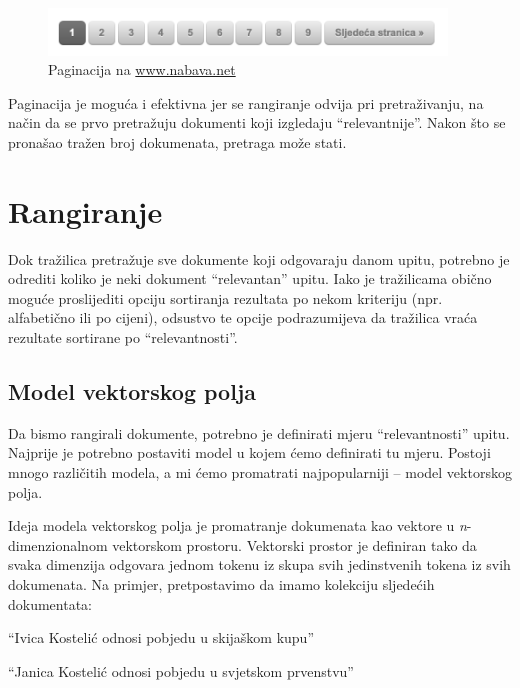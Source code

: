 \documentclass[a4paper,twoside,12pt]{scrreprt}
\begin{document}
\begin{figure}[H]
  \centering
  \includegraphics[width=300pt]{pagination}
  \caption{Paginacija na \url{www.nabava.net}}
  \label{pagination}
\end{figure}

Paginacija je moguća i efektivna jer se rangiranje odvija pri pretraživanju, na način da se prvo pretražuju dokumenti koji izgledaju ``relevantnije''. Nakon što se pronašao tražen broj dokumenata, pretraga može stati.

\section{Rangiranje}


Dok tražilica pretražuje sve dokumente koji odgovaraju danom upitu, potrebno je odrediti koliko je neki dokument ``relevantan'' upitu. Iako je tražilicama obično moguće proslijediti opciju sortiranja rezultata po nekom kriteriju (npr. alfabetično ili po cijeni), odsustvo te opcije podrazumijeva da tražilica vraća rezultate sortirane po ``relevantnosti''.

\subsection{Model vektorskog polja}

Da bismo rangirali dokumente, potrebno je definirati mjeru ``relevantnosti'' upitu. Najprije je potrebno postaviti model u kojem ćemo definirati tu mjeru. Postoji mnogo različitih modela, a mi ćemo promatrati najpopularniji – model vektorskog polja.

Ideja modela vektorskog polja je promatranje dokumenata kao vektore u \textit{n}-dimenzionalnom vektorskom prostoru. Vektorski prostor je definiran tako da svaka dimenzija odgovara jednom tokenu iz skupa svih jedinstvenih tokena iz svih dokumenata. Na primjer, pretpostavimo da imamo kolekciju sljedećih dokumentata:

\begin{compactenum}
  \item ``Ivica Kostelić odnosi pobjedu u skijaškom kupu''
  \item ``Janica Kostelić odnosi pobjedu u svjetskom prvenstvu''
\end{compactenum}
\end{document}
